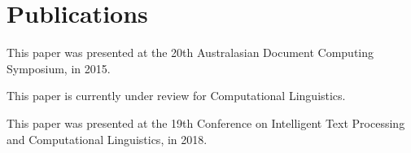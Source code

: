 \documentclass{book}
\begin{document}
\part{Publications}
%
%
%
%
%




\begin{preamble}
	This paper was presented at the 20th Australasian Document Computing Symposium, in 2015.
\end{preamble}



\begin{preamble}
	This paper is currently under review for Computational Linguistics.
\end{preamble}


\begin{preamble}
	This paper was presented at the 19th Conference on Intelligent Text Processing and Computational Linguistics, in 2018.
\end{preamble}
\end{document}
